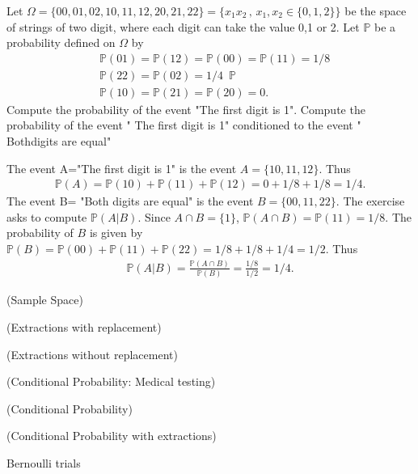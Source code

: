 \documentclass[12pt]{article}
\newcommand{\<}{{\langle \!\! \langle}}
\renewcommand{\>}{{\rangle \!\! \rangle}}
\newcommand{\bel}[2]{\begin{equation} \label{#1} \begin{split} #2
 					\end{split} \end{equation}}
\begin{document}
\begin{ExerciseList}

	\Exercise Let $\Omega = \{00,01,02,10,11,12,20,21,22\}= \{x_1x_2\,,\,x_1,x_2\in\{0,1,2\}\}$ be the space of strings of two digit, where each digit can take the value 0,1 or 2. Let $\mathbb{P}$ be a probability defined on $\Omega$ by 
	\bel{}{ & \mathbb{P}(01) = \mathbb{P}(12) = \mathbb{P}(00)=\mathbb{P}(11) = 1/8 \\
		 & \mathbb{P}(22)= \mathbb{P}(02) = 1/4\,\,\,\mathbb{P}\\
		 & \mathbb{P}(10) = \mathbb{P}(21)= \mathbb{P}(20) = 0.}
		 \Question Compute the probability of the event "The first digit is 1".
		 \Question Compute the probability of the event " The first digit is 1" conditioned to the event " Bothdigits are equal"

		 \Answer 
		 \Question The event A="The first digit is 1" is the event $A=\{10,11,12\}$. Thus 
		 \bel{}{\mathbb{P}(A)= \mathbb{P}(10)+\mathbb{P}(11)+\mathbb{P}(12)=0+1/8+1/8 = 1/4.}
		 \Question The event B= "Both digits are equal" is the event $B = \{00,11,22\}$. The exercise asks to compute $\mathbb{P}(A|B)$. Since $A\cap B = \{1\}$, $\mathbb{P}(A\cap B) = \mathbb{P}(11)= 1/8$. The probability of $B$ is given by $\mathbb{P}(B) = \mathbb{P}(00)+\mathbb{P}(11)+\mathbb{P}(22) = 1/8+ 1/8+1/4= 1/2 $. Thus 
		 \bel{}{\mathbb{P}(A|B) =\frac{ \mathbb{P}(A\cap B)}{\mathbb{P}(B)} = \frac{1/8}{1/2}= 1/4.}

	\Exercise (Sample Space) 

	\Exercise (Extractions with replacement)  


	\Exercise (Extractions without replacement)  

	\Exercise (Conditional Probability: Medical testing) 

	\Exercise  (Conditional Probability) 

	\Exercise (Conditional Probability with extractions) 

	\Exercise Bernoulli trials 
	

\end{ExerciseList}
\end{document}
